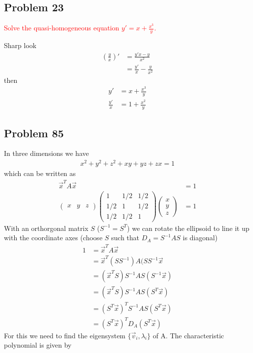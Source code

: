\documentclass[10pt,a4paper]{book}
\theoremstyle{definition}
\begin{document}
\subsection{Problem 23}
\textcolor{red}{Solve the quasi-homogeneous equation $y'=x+\frac{x^3}{y}$.}

Sharp look
\begin{align}
\left(\frac{y}{x}\right)'
&=\frac{y'x-y}{x^2}\\
&=\frac{y'}{x}-\frac{y}{x^2}
\end{align}
then
\begin{align}
y'&=x+\frac{x^3}{y}\\
\frac{y'}{x}&=1+\frac{x^2}{y}
\end{align}

\subsection{Problem 85}
In three dimensions we have
\begin{align}
    x^2+y^2+z^2+xy+yz+zx=1
\end{align}
which can be written as
\begin{align}
\vec{x}^TA\vec{x}&=1\\
\begin{pmatrix}
x & y & z
\end{pmatrix}
\begin{pmatrix}
1 & 1/2 & 1/2\\
1/2 & 1 & 1/2\\
1/2 & 1/2 & 1
\end{pmatrix}
\begin{pmatrix}
x\\
y\\
z
\end{pmatrix}&=1
\end{align}
With an orthorgonal matrix $S$ ($S^{-1}=S^T$) we can rotate the ellipsoid to line it up with the coordinate axes (choose $S$ such that $D_A=S^{-1}AS$ is diagonal)
\begin{align}
1&=\vec{x}^TA\vec{x}\\
&=\vec{x}^T(SS^{-1})A(SS^{-1}\vec{x}\\
&=(\vec{x}^TS)S^{-1}AS(S^{-1}\vec{x})\\
&=(\vec{x}^TS)S^{-1}AS(S^T\vec{x})\\
&=(S^T\vec{x})^TS^{-1}AS(S^T\vec{x})\\
&=(S^T\vec{x})^TD_A(S^T\vec{x})
\end{align}
For this we need to find the eigensystem $\{\vec{v}_i,\lambda_i\}$ of A. The characteristic polynomial is given by
\end{document}
